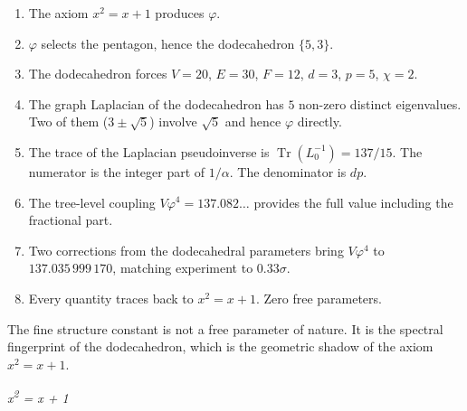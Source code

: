 \documentclass[11pt,a4paper]{article}
\theoremstyle{plain}
\theoremstyle{definition}
\newcommand{\vp}{\varphi}
\DeclareMathOperator{\Tr}{Tr}
\begin{document}
\begin{enumerate}
  \item The axiom $x^2 = x + 1$ produces $\vp$.
  \item $\vp$ selects the pentagon, hence the dodecahedron $\{5,3\}$.
  \item The dodecahedron forces $V = 20$, $E = 30$, $F = 12$, $d = 3$,
    $p = 5$, $\chi = 2$.
  \item The graph Laplacian of the dodecahedron has $5$ non-zero distinct
    eigenvalues.  Two of them ($3 \pm \sqrt{5}$) involve $\sqrt{5}$
    and hence $\vp$ directly.
  \item The trace of the Laplacian pseudoinverse is $\Tr(L_0^{-1}) = 137/15$.
    The numerator is the integer part of $1/\alpha$.  The denominator is $dp$.
  \item The tree-level coupling $V\vp^4 = 137.082\ldots$ provides the
    full value including the fractional part.
  \item Two corrections from the dodecahedral parameters bring $V\vp^4$
    to $137.035\,999\,170$, matching experiment to $0.33\sigma$.
  \item Every quantity traces back to $x^2 = x + 1$.  Zero free parameters.
\end{enumerate}

The fine structure constant is not a free parameter of nature.  It is the
spectral fingerprint of the dodecahedron, which is the geometric shadow of
the axiom $x^2 = x + 1$.

\bigskip
\begin{center}
\textit{x\textsuperscript{2} = x + 1}
\end{center}
\end{document}
